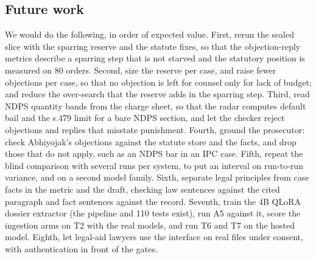 \subsection{Future work}

We would do the following, in order of expected value.
First, rerun the sealed slice with the sparring reserve and the statute fixes, so that the objection-reply metrics describe a sparring step that is not starved and the statutory position is measured on 80 orders.
Second, size the reserve per case, and raise fewer objections per case, so that no objection is left for counsel only for lack of budget; and reduce the over-search that the reserve adds in the sparring step.
Third, read NDPS quantity bands from the charge sheet, so that the radar computes default bail and the s.479 limit for a bare NDPS section, and let the checker reject objections and replies that misstate punishment.
Fourth, ground the prosecutor: check Abhiyojak's objections against the statute store and the facts, and drop those that do not apply, such as an NDPS bar in an IPC case.
Fifth, repeat the blind comparison with several runs per system, to put an interval on run-to-run variance, and on a second model family.
Sixth, separate legal principles from case facts in the metric and the draft, checking law sentences against the cited paragraph and fact sentences against the record.
Seventh, train the 4B QLoRA dossier extractor (the pipeline and 110 tests exist), run A5 against it, score the ingestion arms on T2 with the real models, and run T6 and T7 on the hosted model.
Eighth, let legal-aid lawyers use the interface on real files under consent, with authentication in front of the gates.
